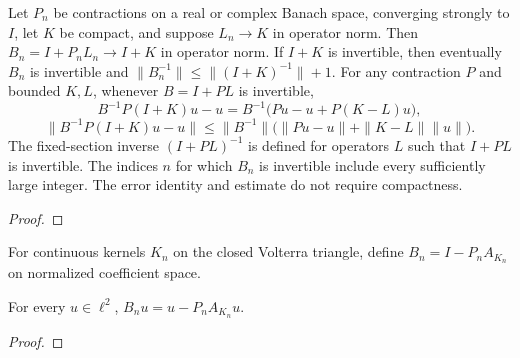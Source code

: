 \begin{supporting}
\begin{theorem}
\label{thm:approximate-finite-sections}
\leanok
Let $P_n$ be contractions on a real or complex Banach space, converging
strongly to $I$, let $K$ be compact, and suppose $L_n\to K$ in operator norm.
Then $B_n=I+P_nL_n\to I+K$ in operator norm. If $I+K$ is invertible,
then eventually $B_n$ is invertible and
$\|B_n^{-1}\|\le\|(I+K)^{-1}\|+1$.
For any contraction $P$ and bounded $K,L$, whenever $B=I+PL$ is invertible,
\[
 B^{-1}P(I+K)u-u=B^{-1}\bigl(Pu-u+P(K-L)u\bigr),
\]
\[
 \|B^{-1}P(I+K)u-u\|
 \le\|B^{-1}\|\bigl(\|Pu-u\|+\|K-L\|\|u\|\bigr).
\]
The fixed-section inverse $(I+PL)^{-1}$ is defined for operators $L$ such that $I+PL$ is invertible. The indices $n$ for which $B_n$ is invertible include every sufficiently large integer. The error identity and estimate do not require compactness.
\end{theorem}
\begin{proof}
\leanok
\end{proof}

\begin{definition}
\label{def:approximate-volterra-coefficient-section}
\leanok
For continuous kernels $K_n$ on the closed Volterra triangle, define
$B_n=I-P_nA_{K_n}$ on normalized coefficient space.
\end{definition}

\begin{theorem}
\label{thm:approximate-volterra-coefficient-section}
\leanok
For every $u\in\ell^2$, $B_nu=u-P_nA_{K_n}u$.
\end{theorem}
\begin{proof}
\leanok
\end{proof}


\end{supporting}
